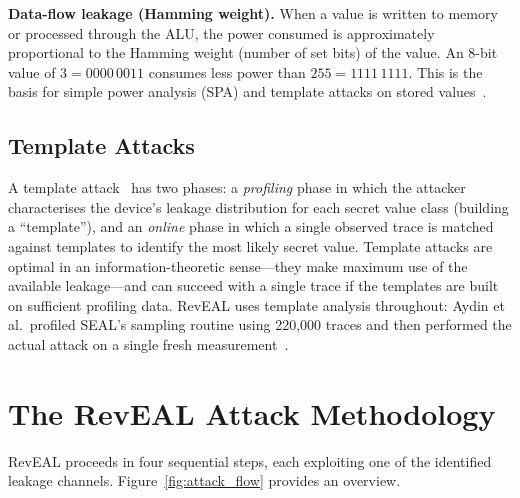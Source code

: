 \documentclass[sigconf,nonacm]{acmart}
\begin{document}
\textbf{Data-flow leakage (Hamming weight).} When a value is written to memory or
processed through the ALU, the power consumed is approximately proportional to the
Hamming weight (number of set bits) of the value. An 8-bit value of $3 = 0000\,0011$
consumes less power than $255 = 1111\,1111$. This is the basis for simple power
analysis (SPA) and template attacks on stored values~\cite{mangard2007}.

\subsection{Template Attacks}

A template attack~\cite{chari2002} has two phases: a \emph{profiling} phase in which
the attacker characterises the device's leakage distribution for each secret value
class (building a ``template''), and an \emph{online} phase in which a single
observed trace is matched against templates to identify the most likely secret value.
Template attacks are optimal in an information-theoretic sense---they make maximum
use of the available leakage---and can succeed with a single trace if the templates
are built on sufficient profiling data. RevEAL uses template analysis throughout:
Aydin et al.\ profiled SEAL's sampling routine using 220{,}000 traces and then
performed the actual attack on a single fresh measurement~\cite{aydin2022reveal}.

\section{The RevEAL Attack Methodology}
\label{sec:attack}

RevEAL proceeds in four sequential steps, each exploiting one of the identified
leakage channels. Figure~\ref{fig:attack_flow} provides an overview.
\end{document}
